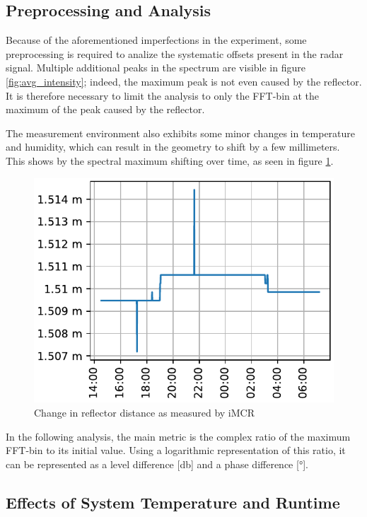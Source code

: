 \subsection{Preprocessing and Analysis}
Because of the aforementioned imperfections in the experiment, some preprocessing is required to analize the systematic offsets present in the radar signal.
Multiple additional peaks in the spectrum are visible in figure \ref{fig:avg_intensity}; indeed, the maximum peak is not even caused by the reflector.
It is therefore necessary to limit the analysis to only the FFT-bin at the maximum of the peak caused by the reflector.

The measurement environment also exhibits some minor changes in temperature and humidity, which can result in the geometry to shift by a few millimeters.
This shows by the spectral maximum shifting over time, as seen in figure \ref{fig:refldist}.

\begin{figure}
    \centering
    \includegraphics[width=\textwidth]{../figures/refldist.pdf}
    \caption{Change in reflector distance as measured by iMCR}
    \label{fig:refldist}
\end{figure}

In the following analysis, the main metric is the complex ratio of the maximum FFT-bin to its initial value.
Using a logarithmic representation  of this ratio, it can be represented as a level difference [\unit{\decibel}] and a phase difference [\unit{\degree}].

\subsection{Effects of System Temperature and Runtime}

